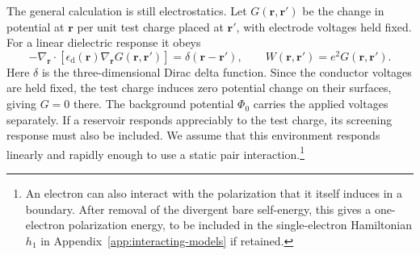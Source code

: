 The general calculation is still electrostatics. Let
$G(\mathbf r,\mathbf r')$ be the change in potential at $\mathbf r$
per unit test charge placed at $\mathbf r'$, with electrode voltages
held fixed. For a linear dielectric response it obeys
\begin{equation}
 -\nabla_{\mathbf r}\cdot
       [\epsilon_{\mathrm d}(\mathbf r)\nabla_{\mathbf r}
         G(\mathbf r,\mathbf r')]
     =\delta(\mathbf r-\mathbf r'),
 \qquad W(\mathbf r,\mathbf r')=e^2G(\mathbf r,\mathbf r').
 \label{eq:device-screening-green}
\end{equation}
Here $\delta$ is the three-dimensional Dirac delta function.
Since the conductor voltages are held fixed, the test charge
induces zero potential change on their surfaces, giving $G=0$
there. The background potential $\Phi_0$ carries the applied
voltages separately.
If a reservoir responds appreciably to the test charge, its
screening response must also be included.
We assume that this environment responds linearly and rapidly
enough to use a static pair interaction.\footnote{An electron
can also interact with the polarization that it itself induces
in a boundary. After removal of the divergent bare self-energy,
this gives a one-electron polarization energy, to be included in
the single-electron Hamiltonian $h_1$ in
Appendix~\ref{app:interacting-models} if retained.}
